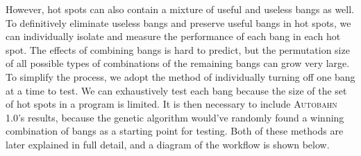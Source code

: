 \documentclass[format=sigplan]{acmart}
\newcommand{\hotspot}[0]{hot spot}
\newcommand{\hotspots}[0]{hot spots}
\newcommand{\useful}[0]{useful}
\newcommand{\useless}[0]{useless}
\newcommand{\Ao}[0]{\textsc{Autobahn 1.0}}
\begin{document}
However, \hotspots{} can also contain a mixture of \useful{} and \useless{} bangs as well. To definitively eliminate \useless{} bangs and preserve \useful{} bangs in \hotspots{}, we can individually isolate and measure the performance of each bang in each \hotspot{}. The effects of combining bangs is hard to predict, but the permutation size of all possible types of combinations of the remaining bangs can grow very large. To simplify the process, we adopt the method of individually turning off one bang at a time to test. We can exhaustively test each bang because the size of the set of \hotspots{} in a program is limited. It is then necessary to include \Ao{}'s results, because the genetic algorithm would've randomly found a winning combination of bangs as a starting point for testing. Both of these methods are later explained in full detail, and a diagram of the workflow is shown below.

\end{document}
